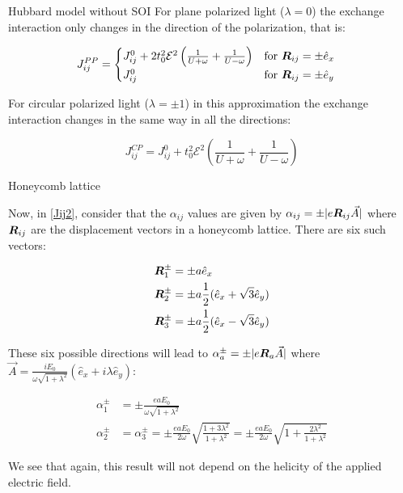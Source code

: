 \begin{section}{Hubbard model without SOI}
For plane polarized light ($\lambda = 0$) the exchange interaction only changes in the direction of the polarization, that is:

\begin{equation}
J_{ij}^{PP} = \begin{cases}
		J_{ij}^0 + 2t_0^2 \mathcal{E}^2 \left( \frac{1}{U+\omega} + \frac{1}{U-\omega} \right) & \text{for } \boldsymbol{R}_{ij} = \pm \hat{e}_x \\
J_{ij}^0 & \text{for } \boldsymbol{R}_{ij} = \pm \hat{e}_y
\end{cases} \quad 
\end{equation}

For circular polarized light ($\lambda=\pm1$) in this approximation the exchange interaction changes in the same way in all the directions:

\begin{equation}
J_{ij}^{CP} = J_{ij}^0 + t_0^2 \mathcal{E}^2 \left( \frac{1}{U+\omega} + \frac{1}{U-\omega} \right)
\end{equation}

\begin{subsection}{Honeycomb lattice}

Now, in \ref{Jij2}, consider that the $\alpha_{ij}$ values are given by $\alpha_{ij} = \pm|e\boldsymbol{R}_{ij}\vec{A}|$ where $\boldsymbol{R}_{ij}$ are the displacement vectors in a honeycomb lattice. There are six such vectors:

\begin{align}
\boldsymbol{R}_1^\pm &= \pm a\hat{e}_x \\
\boldsymbol{R}_2^\pm &= \pm a\frac{1}{2}(\hat{e}_x + \sqrt{3}\hat{e}_y) \\
\boldsymbol{R}_3^\pm &= \pm a\frac{1}{2}(\hat{e}_x - \sqrt{3}\hat{e}_y)
\end{align}

These six possible directions will lead to $\alpha_a^\pm = \pm |e\boldsymbol{R}_a\vec{A}|$ where $\vec{A}=\frac{iE_0}{\omega\sqrt{1+\lambda^2}}(\hat{e}_x+i\lambda\hat{e}_y)$:

\begin{align}
\alpha_1^\pm &= \pm \frac{eaE_0}{\omega\sqrt{1+\lambda^2}} \\
\alpha_2^\pm &= \alpha_3^\pm = \pm \frac{eaE_0}{2\omega} \sqrt{\frac{1+3\lambda^2}{1+\lambda^2}} = \pm\frac{eaE_0}{2\omega}\sqrt{1+\frac{2\lambda^2}{1+\lambda^2}}
\end{align}

We see that again, this result will not depend on the helicity of the applied electric field.

\end{subsection}

\end{section}

